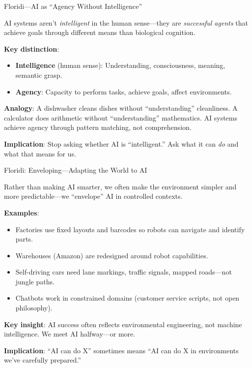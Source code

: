 \documentclass[aspectratio=169,11pt]{beamer}
\begin{document}
\begin{frame}{Floridi---AI as ``Agency Without Intelligence'' \parencite{floridi_ethics_ai}}
\begin{conceptbox}
\small
AI systems aren't \emph{intelligent} in the human sense---they are \emph{successful agents} that achieve goals through different means than biological cognition.
\end{conceptbox}

\vspace{0.2em}
\textbf{Key distinction}:
\begin{itemize}
    \item \textbf{Intelligence} (human sense): Understanding, consciousness, meaning, semantic grasp.
    \item \textbf{Agency}: Capacity to perform tasks, achieve goals, affect environments.
\end{itemize}

\vspace{0.2em}
\textbf{Analogy}: A dishwasher cleans dishes without ``understanding'' cleanliness. A calculator does arithmetic without ``understanding'' mathematics. AI systems achieve agency through pattern matching, not comprehension.

\vspace{0.2em}
\textbf{Implication}: Stop asking whether AI is ``intelligent.'' Ask what it can \emph{do} and what that means for us.
\end{frame}

\begin{frame}{Floridi: Enveloping---Adapting the World to AI}
\begin{conceptbox}
\small
Rather than making AI smarter, we often make the environment simpler and more predictable---we ``envelope'' AI in controlled contexts.
\end{conceptbox}

\vspace{0.2em}
\textbf{Examples}:
\begin{itemize}
    \item Factories use fixed layouts and barcodes so robots can navigate and identify parts.
    \item Warehouses (Amazon) are redesigned around robot capabilities.
    \item Self-driving cars need lane markings, traffic signals, mapped roads---not jungle paths.
    \item Chatbots work in constrained domains (customer service scripts, not open philosophy).
\end{itemize}

\vspace{0.2em}
\textbf{Key insight}: AI success often reflects environmental engineering, not machine intelligence. We meet AI halfway---or more.

\vspace{0.2em}
\textbf{Implication}: ``AI can do X'' sometimes means ``AI can do X in environments we've carefully prepared.''
\end{frame}
\end{document}
